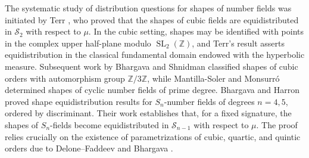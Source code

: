 \documentclass[table]{amsart}
\newcommand{\Z}{\mathbb{Z}}
\numberwithin{equation}{section}
\begin{document}
The systematic study of distribution questions for shapes of number fields was initiated by Terr \cite{Terr97}, who proved that the shapes of cubic fields are equidistributed in $\mathcal{S}_2$ with respect to $\mu$. In the cubic setting, shapes may be identified with points in the complex upper half-plane modulo $\operatorname{SL}_2(\Z)$, and Terr’s result asserts equidistribution in the classical fundamental domain endowed with the hyperbolic measure. Subsequent work by Bhargava and Shnidman \cite{BS14} classified shapes of cubic orders with automorphism group $\Z/3\Z$, while Mantilla-Soler and Monsurró \cite{MSM16} determined shapes of cyclic number fields of prime degree. Bhargava and Harron \cite{BH16} proved shape equidistribution results for $S_n$-number fields of degrees $n=4,5$, ordered by discriminant. Their work establishes that, for a fixed signature, the shapes of $S_n$-fields become equidistributed in $\mathcal{S}_{n-1}$ with respect to $\mu$. The proof relies crucially on the existence of parametrizations of cubic, quartic, and quintic orders due to Delone–Faddeev \cite{DeloneFaddeev} and Bhargava \cite{HighercompositionIII, HighercompositionIV}.
\end{document}
